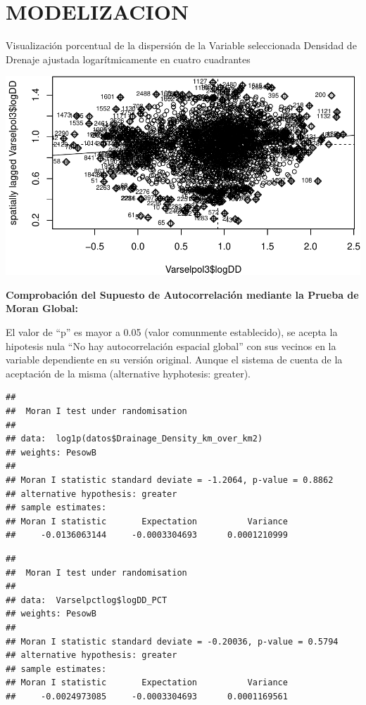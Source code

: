 \documentclass[11pt,]{article}
\begin{document}
\section{MODELIZACION}\label{modelizacion}

Visualización porcentual de la dispersión de la Variable seleccionada
Densidad de Drenaje ajustada logarítmicamente en cuatro cuadrantes

\includegraphics{proyecto_f_files/figure-latex/unnamed-chunk-21-1.pdf}

\textbf{Comprobación del Supuesto de Autocorrelación mediante la Prueba
de Moran Global:}

El valor de ``p'' es mayor a 0.05 (valor comunmente establecido), se
acepta la hipotesis nula ``No hay autocorrelación espacial global'' con
sus vecinos en la variable dependiente en su versión original. Aunque el
sistema de cuenta de la aceptación de la misma (alternative hyphotesis:
greater).

\begin{verbatim}
## 
##  Moran I test under randomisation
## 
## data:  log1p(datos$Drainage_Density_km_over_km2)  
## weights: PesowB    
## 
## Moran I statistic standard deviate = -1.2064, p-value = 0.8862
## alternative hypothesis: greater
## sample estimates:
## Moran I statistic       Expectation          Variance 
##     -0.0136063144     -0.0003304693      0.0001210999
\end{verbatim}

\begin{verbatim}
## 
##  Moran I test under randomisation
## 
## data:  Varselpctlog$logDD_PCT  
## weights: PesowB    
## 
## Moran I statistic standard deviate = -0.20036, p-value = 0.5794
## alternative hypothesis: greater
## sample estimates:
## Moran I statistic       Expectation          Variance 
##     -0.0024973085     -0.0003304693      0.0001169561
\end{verbatim}
\end{document}
